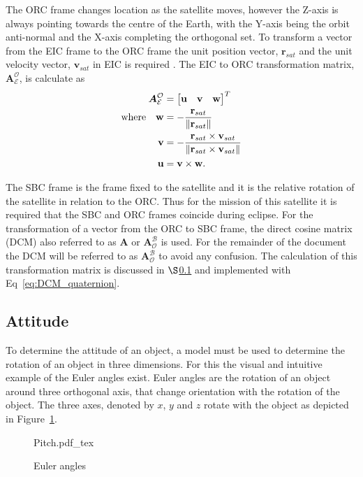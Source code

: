 The ORC frame changes location as the satellite moves, however the Z-axis is always pointing towards the centre of the Earth, with the Y-axis being the orbit anti-normal and the X-axis completing the orthogonal set. To transform a vector from the EIC frame to the ORC frame the unit position vector, $\mathbf{r}_{sat}$ and the unit velocity vector, $\mathbf{v}_{sat}$ in EIC is required \cite{Chen_ground-target}. The EIC to ORC transformation matrix, $\boldsymbol{A}^{\mathcal{O}}_{\mathcal{E}}$, is calculate as
\begin{equation}
\label{Eq: ORC to EIC}
\begin{aligned}
	\boldsymbol{A}^{\mathcal{O}}_{\mathcal{E}} &= 
	\begin{bmatrix}
		\mathbf{u} & \mathbf{v} & \mathbf{w}\\
	\end{bmatrix}^T \\
\text{where} \quad
\mathbf{w} &= -\frac{\mathbf{r}_{sat}}{\left\lVert\mathbf{r}_{sat}\right\rVert} \\
\mathbf{v} &= -\frac{\mathbf{r}_{sat} \times \mathbf{v}_{sat}}{\left\lVert\mathbf{r}_{sat} \times \mathbf{v}_{sat}\right\rVert} \\
\mathbf{u} &= \mathbf{v} \times \mathbf{w}. \\
\end{aligned}
\end{equation}

The SBC frame is the frame fixed to the satellite and it is the relative rotation of the satellite in relation to the ORC. Thus for the mission of this satellite it is required that the SBC and ORC frames coincide during eclipse. For the transformation of a vector from the ORC to SBC frame, the direct cosine matrix (DCM) also referred to as $\boldsymbol{A}$ or $\boldsymbol{A}^{\mathcal{B}}_{\mathcal{O}}$ is used. For the remainder of the document the DCM will be referred to as $\boldsymbol{A}^{\mathcal{B}}_{\mathcal{O}}$ to avoid any confusion. The calculation of this transformation matrix is discussed in $\S$\ref{subsection_quaternions} and implemented with Eq~\ref{eq:DCM_quaternion}.


\subsection{Attitude}
\label{subsection_quaternions}
To determine the attitude of an object, a model must be used to determine the rotation of an object in three dimensions. For this the visual and intuitive example of the Euler angles exist. Euler angles are the rotation of an object around three orthogonal axis, that change orientation with the rotation of the object. The three axes, denoted by $x$, $y$ and $z$ rotate with the object as depicted in Figure~\ref{fig:Pitch}.
\begin{figure}[!htb]
	\centering
	\def\svgwidth{10cm}
	{Pitch.pdf_tex}
	\caption{Euler angles}
	\label{fig:Pitch}
\end{figure}


